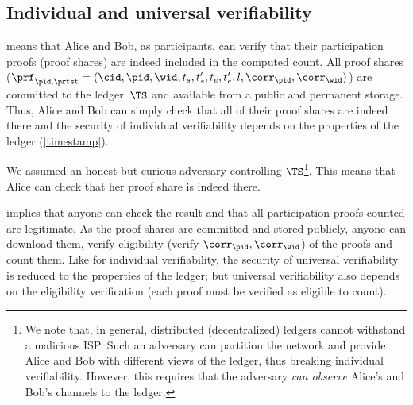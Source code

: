 \subsection{Individual and universal verifiability}%
\label{analysis-individual}%
\label{analysis-universal}

 means that Alice and Bob, as participants, can verify 
that their participation proofs (\ie proof shares) are indeed included in the 
computed count.
All proof shares (\ie \(\prf_{\pid, \prtst} = (\cid, \pid, \wid, t_s, t_s', 
  t_e, t_e', l, \corr_\pid, \corr_\wid)\)) are committed to the ledger~\(\TS\) 
and available from a public and permanent storage.
Thus, Alice and Bob can simply check that all of their proof shares are indeed 
there and the security of individual verifiability depends on the properties of 
the ledger (\cf \cref{timestamp}).

We assumed an honest-but-curious adversary controlling \(\TS\)\footnote{%
  We note that, in general, distributed (decentralized) ledgers cannot 
  withstand a malicious \ac{ISP}.
  Such an adversary can partition the network and provide Alice and Bob with 
  different views of the ledger, thus breaking individual verifiability.
  However, this requires that the adversary \emph{can observe} Alice's and 
  Bob's channels to the ledger.
}.
This means that Alice can check that her proof share is indeed there.

 implies that anyone can check the result and that all 
participation proofs counted are legitimate.
As the proof shares are committed and stored publicly, anyone can
download them, verify eligibility (\ie verify \(\corr_\pid,
\corr_{\wid}\)) of the proofs and count them.
Like for individual verifiability, the security of universal verifiability is 
reduced to the properties of the ledger; but universal verifiability also 
depends on the eligibility verification (each proof must be verified as 
eligible to count).

